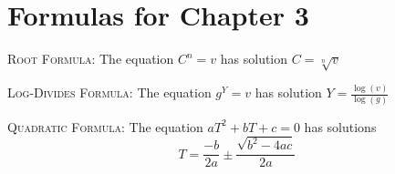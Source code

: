 
\section*{Formulas for Chapter 3}

 \bigskip
 \bigskip
\noindent \hrulefill
 \bigskip
 \bigskip

\noindent \textsc{Root Formula:} \quad
The equation $C^n=v$ has solution $C= \sqrt[n]{v}$

 \bigskip
 \bigskip
\noindent \hrulefill
 \bigskip
 \bigskip
 
\noindent \textsc{Log-Divides Formula:} \quad
The equation $g^Y = v$ has solution $\displaystyle Y = \frac{\log (v)}{\log(g)}$

 \bigskip
 \bigskip
\noindent \hrulefill
 \bigskip
 \bigskip

\noindent \textsc{Quadratic Formula:} \quad The equation $aT^2+bT+c=0$ has solutions \\ $$T = \frac{-b}{2a} \pm \frac{\sqrt{b^2-4ac}}{2a}$$ 

\bigskip
\noindent \hrulefill
 \bigskip
 \bigskip

\vfill %


